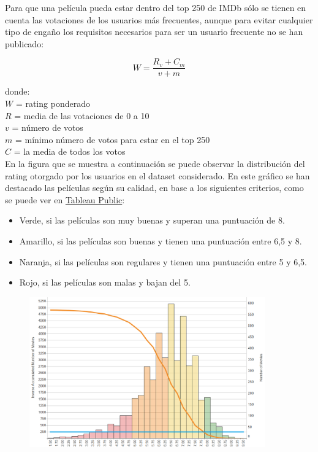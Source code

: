 \documentclass{article}
\begin{document}
Para que una película pueda estar dentro del top 250 de IMDb sólo se tienen en cuenta las votaciones de los usuarios más frecuentes, aunque para evitar cualquier tipo de engaño los requisitos necesarios para ser un usuario frecuente no se han publicado:

\begin{equation}
W=\frac{R_{v}+C_{m}}{v+m}
\end{equation}

\noindent
donde:\\

\indent
$W$ = rating ponderado\\
\indent
$R$ = media de las votaciones de 0 a 10\\
\indent
$v$ = número de votos\\
\indent
$m$ = mínimo número de votos para estar en el top 250\\
\indent
$C$ = la media de todos los votos\\

En la figura que se muestra a continuación se puede observar la distribución del rating otorgado por los usuarios en el dataset considerado. En este gráfico se han destacado las películas según su calidad, en base a los siguientes criterios, como se puede ver en \href{https://public.tableau.com/profile/javier6580\#!/vizhome/proyecto_fin_de_master_dataset/rating_distribution}{Tableau Public}:

\begin{itemize}
  \item Verde, si las películas son muy buenas y superan una puntuación de 8.
  \item Amarillo, si las películas son buenas y tienen una puntuación entre 6,5 y 8.
  \item Naranja, si las películas son regulares y tienen una puntuación entre 5 y 6,5.
  \item Rojo, si las películas son malas y bajan del 5.
\end{itemize}

\begin{figure}[h]
\centering
\includegraphics[width=4in,clip,keepaspectratio]{./images/rating_distribution}
\label{fig:imdb_rating_distribution}
\end{figure}
\end{document}
